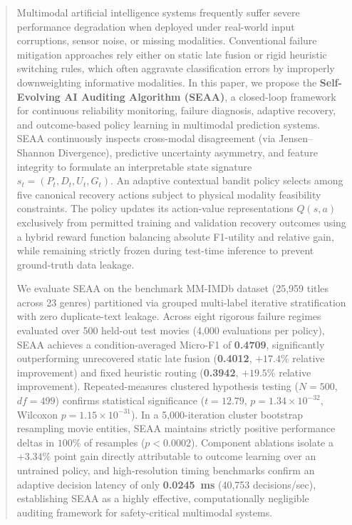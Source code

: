 \documentclass[journal]{IEEEtran}
\begin{document}
\begin{abstract}
Multimodal artificial intelligence systems frequently suffer severe performance degradation when deployed under real-world input corruptions, sensor noise, or missing modalities. Conventional failure mitigation approaches rely either on static late fusion or rigid heuristic switching rules, which often aggravate classification errors by improperly downweighting informative modalities. In this paper, we propose the \textbf{Self-Evolving AI Auditing Algorithm (SEAA)}, a closed-loop framework for continuous reliability monitoring, failure diagnosis, adaptive recovery, and outcome-based policy learning in multimodal prediction systems. SEAA continuously inspects cross-modal disagreement (via Jensen--Shannon Divergence), predictive uncertainty asymmetry, and feature integrity to formulate an interpretable state signature $s_t = (P_t, D_t, U_t, G_t)$. An adaptive contextual bandit policy selects among five canonical recovery actions subject to physical modality feasibility constraints. The policy updates its action-value representations $Q(s, a)$ exclusively from permitted training and validation recovery outcomes using a hybrid reward function balancing absolute F1-utility and relative gain, while remaining strictly frozen during test-time inference to prevent ground-truth data leakage. 

We evaluate SEAA on the benchmark MM-IMDb dataset (25,959 titles across 23 genres) partitioned via grouped multi-label iterative stratification with zero duplicate-text leakage. Across eight rigorous failure regimes evaluated over 500 held-out test movies (4,000 evaluations per policy), SEAA achieves a condition-averaged Micro-F1 of \textbf{0.4709}, significantly outperforming unrecovered static late fusion (\textbf{0.4012}, $+17.4\%$ relative improvement) and fixed heuristic routing (\textbf{0.3942}, $+19.5\%$ relative improvement). Repeated-measures clustered hypothesis testing ($N=500$, $df=499$) confirms statistical significance ($t=12.79$, $p=1.34 \times 10^{-32}$, Wilcoxon $p=1.15 \times 10^{-31}$). In a 5,000-iteration cluster bootstrap resampling movie entities, SEAA maintains strictly positive performance deltas in $100\%$ of resamples ($p < 0.0002$). Component ablations isolate a $+3.34\%$ point gain directly attributable to outcome learning over an untrained policy, and high-resolution timing benchmarks confirm an adaptive decision latency of only \textbf{0.0245~ms} (40,753 decisions/sec), establishing SEAA as a highly effective, computationally negligible auditing framework for safety-critical multimodal systems.
\end{abstract}
\end{document}

